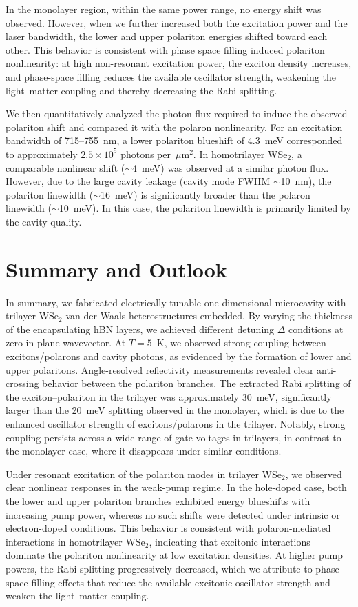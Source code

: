 In the monolayer region, within the same power range, no energy shift was observed. 
However, when we further increased both the excitation power and the laser bandwidth, the lower and upper polariton energies shifted toward each other. 
This behavior is consistent with phase space filling induced polariton nonlinearity: at high non-resonant excitation power, 
the exciton density increases, and phase-space filling reduces the available oscillator strength, weakening the light–matter coupling and thereby decreasing the Rabi splitting.

We then quantitatively analyzed the photon flux required to induce the observed polariton shift and compared it with the polaron nonlinearity. 
For an excitation bandwidth of 715--755~nm, a lower polariton blueshift of 4.3~meV corresponded to approximately $2.5 \times 10^{5}$ photons per~$\mu$m$^{2}$. 
In homotrilayer WSe$_2$, a comparable nonlinear shift ($\sim$4~meV) was observed at a similar photon flux. 
However, due to the large cavity leakage (cavity mode FWHM $\sim$10~nm), the polariton linewidth ($\sim$16~meV) is significantly broader than the polaron linewidth ($\sim$10~meV). 
In this case, the polariton linewidth is primarily limited by the cavity quality.

\section{Summary and Outlook}
In summary, we fabricated electrically tunable one-dimensional microcavity with trilayer WSe$_2$ van der Waals heterostructures embedded. 
By varying the thickness of the encapsulating hBN layers, we achieved different detuning $\Delta$ conditions at zero in-plane wavevector. 
At $T = 5$~K, we observed strong coupling between excitons/polarons and cavity photons, as evidenced by the formation of lower and upper polaritons. 
Angle-resolved reflectivity measurements revealed clear anti-crossing behavior between the polariton branches. 
The extracted Rabi splitting of the exciton–polariton in the trilayer was approximately 30~meV, significantly larger than the 20~meV splitting observed in the monolayer, which is due to the enhanced oscillator strength of excitons/polarons in the trilayer. 
Notably, strong coupling persists across a wide range of gate voltages in trilayers, in contrast to the monolayer case, where it disappears under similar conditions.  

Under resonant excitation of the polariton modes in trilayer WSe$_2$, we observed clear nonlinear responses in the weak-pump regime. 
In the hole-doped case, both the lower and upper polariton branches exhibited energy blueshifts with increasing pump power, whereas no such shifts were detected under intrinsic or electron-doped conditions. 
This behavior is consistent with polaron-mediated interactions in homotrilayer WSe$_2$, indicating that excitonic interactions dominate the polariton nonlinearity at low excitation densities. 
At higher pump powers, the Rabi splitting progressively decreased, which we attribute to phase-space filling effects that reduce the available excitonic oscillator strength and weaken the light–matter coupling.  

